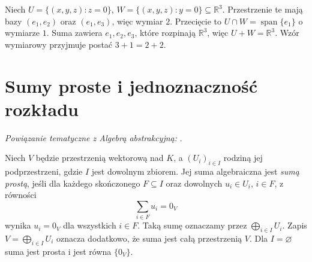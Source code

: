 \begin{przyklad}
\label{prz:lin2-plaszczyzny}
Niech \(U=\{(x,y,z):z=0\}\),
\(W=\{(x,y,z):y=0\}\subseteq\mathbb R^3\).
Przestrzenie te mają bazy \((e_1,e_2)\)
oraz \((e_1,e_3)\), więc wymiar \(2\).
Przecięcie to
\(U\cap W=\operatorname{span}\{e_1\}\)
o wymiarze \(1\).
Suma zawiera \(e_1,e_2,e_3\),
które rozpinają \(\mathbb R^3\),
więc \(U+W=\mathbb R^3\).
Wzór wymiarowy przyjmuje postać \(3+1=2+2\).
\end{przyklad}


\section{Sumy proste i jednoznaczność rozkładu}
\label{sec:lin2-sumy-proste}

\noindent\emph{Powiązanie tematyczne z Algebrą abstrakcyjną:} .


\begin{definicja}
\label{def:lin2-wewnetrzna-suma-prosta}
Niech \(V\) będzie przestrzenią wektorową nad \(K\),
a \((U_i)_{i\in I}\) rodziną jej podprzestrzeni,
gdzie \(I\) jest dowolnym zbiorem. Jej suma algebraiczna
jest \emph{sumą prostą}, jeśli dla każdego
skończonego \(F\subseteq I\) oraz
dowolnych \(u_i\in U_i\), \(i\in F\),
z równości
\[
 \sum_{i\in F}u_i=0_V
\]
wynika \(u_i=0_V\) dla wszystkich \(i\in F\).
Taką sumę oznaczamy przez
\(\bigoplus_{i\in I}U_i\).
Zapis \(V=\bigoplus_{i\in I}U_i\)
oznacza dodatkowo, że suma jest całą przestrzenią \(V\).
Dla \(I=\varnothing\) suma jest prosta
i jest równa \(\{0_V\}\).
\end{definicja}

